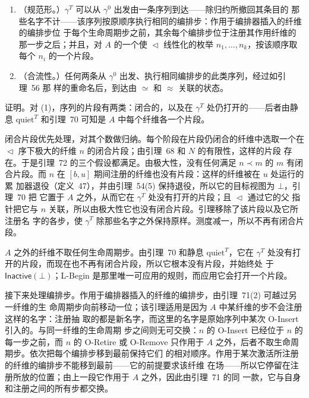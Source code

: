\begin{enumerate}
\def\labelenumi{\arabic{enumi}.}
\item
  （规范形。）\(\gamma^{T}\) 可以从 \(\gamma^{0}\) 出发由一条序列到达——除归约所撤回其条目的
  那些名字不计——该序列按原顺序执行相同的编排步：作用于编排器插入的纤维的编排步位
  于每个生命周期步之前，其余每个编排步位于注册其作用纤维的那一步之后；并且，对
  \(A\) 的一个使 \(\vartriangleleft\) 线性化的枚举 \(n_{1}, \ldots, n_{k}\)，按该顺序取每个
  \(n_{i}\) 的一个片段。
\item
  （合流性。）任何两条从 \(\gamma^{0}\) 出发、执行相同编排步的此类序列，经过如引理~56 那
  样的重命名后，到达由 \(\simeq\) 和 \(\approx\) 关联的状态。
\end{enumerate}

证明。对 (1)，序列的片段有两类：闭合的，以及在 \(\gamma^{T}\) 处仍打开的——后者由静息
\(\mathrm{quiet}^{T}\) 和引理~70 可知是 \(A\) 中每个纤维各一个片段。

闭合片段优先处理，对其个数做归纳。每个阶段在片段仍闭合的纤维中选取一个在
\(\vartriangleleft\) 序下极大的纤维 \(n\) 的闭合片段；由引理~68 和 \(N\) 的有限性，这样的片段
存在。于是引理~72 的三个假设都满足。由极大性，没有任何满足 \(n \prec m\) 的 \(m\) 有闭
合片段。而 \(n\) 在 \([b, u]\) 期间注册的纤维也没有片段：这样的纤维被在 \(u\) 处运行的累
加器退役（定义~47），并由引理~54(5) 保持退役，所以它的目标视图为 \(\bot\)，引理~70 把
它置于 \(A\) 之外，从而它在 \(\gamma^{T}\) 处没有打开的片段；且 \(\vartriangleleft\) 通过它的父
指针把它与 \(n\) 关联，所以由极大性它也没有闭合片段。引理移除了该片段以及它所注册名
字的各步，使 \(\gamma^{T}\) 除那些名字之外保持原样。测度减一，所以不再有闭合片段。

\(A\) 之外的纤维不取任何生命周期步。由引理~70 和静息 \(\mathrm{quiet}^{T}\)，它在
\(\gamma^{T}\) 处没有打开的片段，而现在也不再有闭合片段，所以它根本没有片段，并始终处
于 \(\mathsf{Inactive}(\bot)\)；L-Begin 是那里唯一可应用的规则，而应用它会打开一个片段。

接下来处理编排步。作用于编排器插入的纤维的编排步，由引理~71(2) 可越过另一纤维的生
命周期步向前移动一位；该引理适用是因为 \(A\) 中某纤维的步不会注册这样的名字：注册抽
取的都是新名字，而这里的名字是原始序列中某次 O-Insert 引入的。与同一纤维的生命周期
步之间则无可交换：\(n\) 的 O-Insert 已经位于 \(n\) 的每一步之前，而 \(n\) 的 O-Retire 或
O-Remove 只作用于 \(A\) 之外，后者不取生命周期步。依次把每个编排步移到最前保持它们
的相对顺序。作用于某次激活所注册的纤维的编排步不能移到最前——它的前提要求该纤维
在场——所以它停留在注册所放的位置；由上一段它作用于 \(A\) 之外，因此由引理~71 的同
一款，它与自身和注册之间的所有步都交换。

